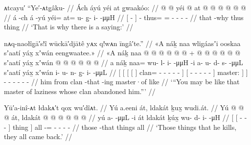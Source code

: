 \ex\label{ex:90-104-thats-why-saying}%
%
\begingl
	\glpreamble	ᴀtcayu′ “Ye′-ᴀtg̣âku- //
	\glpreamble	Ách áyú yéi at g̱waakóo: //
	\gla	{}  @ {} {}
		 @ {}
		yéi @ at @  @ {} @ {} @ {} @ {} @ {} //
	\glb	{} á -ch {}
		á -yú
		yéi= at= u- {} g̱- i-  -μμH //
	\glc	{}[  - {}]
		 -
		thus= = - \· - -  - //
	\gld	{} that -why {}
		 {}
		thus thing  {} {} {} {} {} //
	\glft	‘That is why there is a saying:’
		//
\endgl
\xe

\ex\label{ex:90-105-you-may-be-like-him}%
%
\begingl
	\glpreamble	nᴀq-naołîg̣ā′s!î wūckā′djātê yᴀx q!wᴀn īng̣â′te.” //
	\glpreamble	«\!A náḵ naa wligáasʼi ooskaa sʼaatí yáx̱ xʼwán eeng̱waatee.\!» //
	\gla	{} {} {} {} «\!A náḵ {}
					naa @  @ {} @ {} @ {} @ {} @ {} {} +
				{}  @ {} @ {} @ {} @ {} @ {} @ {} {}
				sʼaatí {}
			yáx̱ {}
		xʼwán
		 @ {} @ {} @ {} @ {} @ {} @ {} //
	\glb	{} {} {} {} a náḵ {}
					naa= wu- l- i-  -μμH -i {}
				{} a- u- d- s-  -μμL {} {}
				sʼaatí {}
			yáx̱ {}
		xʼwán
		i- u- n- g̱- i-  -μμL //
	\glc	{}[ {}[ {}[ {}[   {}]
					clan= - - -  - - {}]
				{}[ - - - -  - \· {}]
				master: {}]
			 {}]
		- - - - -  - //
	\gld	{} {} {} {} him from {}
					clan  {} {} {} {} -that {}
					{}  {} {} {} {} {} -ing {}
				master·of {}
			like {}
		 {} {} {} {} {} {} //
	\glft	‘“You may be like that master of laziness whose clan abandoned him.”’
		//
\endgl
\xe

\ex\label{ex:90-106-things-came-back}%
%
\begingl
	\glpreamble	Yū′a-inî-ᴀt łdakᴀ′t qox wu′dîᴀt. //
	\glpreamble	Yú a.eeni át, ldakát ḵux̱ wudi.át. //
	\gla	{} Yú {}  @ {} @ {} @ {} {} át, {}
		ldakát
		 @ {} @  @ {} @ {} @ {} @ {} //
	\glb	{} yú {} a-  -μμL -i {} át {}
		ldakát
		ḵúx̱ {} wu- d- i-  -μH //
	\glc	{}[  {}[ -  - - {}] thing {}]
		all
		 -= - - -  - //
	\gld	{} those {}  {} {} -that {} things {}
		all
		 {}  {} {} {} {} //
	\glft	‘Those things that he kills, they all came back.’
		//
\endgl
\xe

